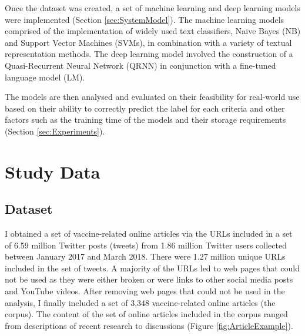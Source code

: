\documentclass[a4paper,twoside,phd]{BYUPhys}
\begin{document}
Once the dataset was created, a set of machine learning and deep learning models were implemented (Section \ref{sec:SystemModel}). The machine learning models comprised of the implementation of widely used text classifiers, Naive Bayes (NB) and Support Vector Machines (SVMs), in combination with a variety of textual representation methods. The deep learning model involved the construction of a Quasi-Recurrent Neural Network (QRNN) in conjunction with a fine-tuned language model (LM). \newline

The models are then analysed and evaluated on their feasibility for real-world use based on their ability to correctly predict the label for each criteria and other factors such as the training time of the models and their storage requirements (Section \ref{sec:Experiments}).

\section{Study Data}
\label{sec:StudyData}

\subsection{Dataset}
\label{sec:Dataset}

I obtained a set of vaccine-related online articles via the URLs included in a set of 6.59 million Twitter posts (tweets) from 1.86 million Twitter users collected between January 2017 and March 2018. There were 1.27 million unique URLs included in the set of tweets. A majority of the URLs led to web pages that could not be used as they were either broken or were links to other social media posts and YouTube videos. After removing web pages that could not be used in the analysis, I finally included a set of 3,348 vaccine-related online articles (the corpus). The content of the set of online articles included in the corpus ranged from descriptions of recent research to discussions (Figure \ref{fig:ArticleExample}). \newline
\end{document}
